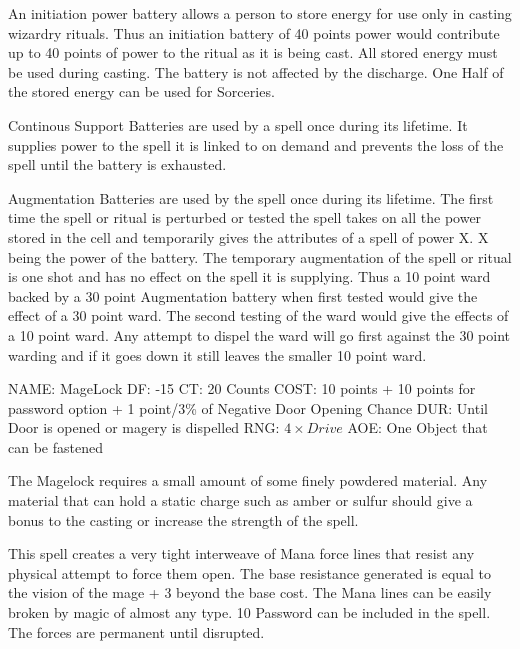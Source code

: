An initiation power battery allows a person to store energy
for use only in casting wizardry rituals. Thus an initiation battery of
40 points power would contribute up to 40 points of power to the
ritual as it is being cast. All stored energy must be used during casting.
The battery is not affected by the discharge. One Half of the stored energy
can be used for Sorceries.

Continous Support Batteries are used by a spell once during
its lifetime.  It supplies power to the spell it is linked to on demand and
prevents the loss of the spell until the battery is exhausted.

Augmentation Batteries are used by the spell once during its lifetime. The
first time the spell or ritual is perturbed or tested the spell takes on all
the power stored in the cell and temporarily gives the attributes of a spell
of power X. X being the power of the battery. The temporary augmentation of
the spell or ritual is one shot and has no effect on the spell it is
supplying. Thus a 10 point ward backed by a 30 point Augmentation battery
when first tested would give the effect of a 30 point ward. The second
testing of the ward would give the effects of a 10 point ward. Any attempt to
dispel the ward will go first against the 30 point warding and if it goes
down it still leaves the smaller 10 point ward.

\newpage

\spell
NAME: MageLock
DF:   -15
CT:  20 Counts
COST:  10 points + 10 points for password option + 1 point/3\% of Negative Door Opening Chance
DUR:  Until Door is opened or magery is dispelled
RNG: \( 4 \times Drive \)
AOE:  One Object that can be fastened


The Magelock requires a small amount of some finely powdered
material. Any material that can hold a static charge such as amber or
sulfur should give a bonus to the casting or increase the strength of
the spell.


This spell creates a very tight interweave of Mana force lines that
resist any physical attempt to force them open.  The base resistance
generated is equal to the vision of the mage + 3%
beyond the base cost. The Mana lines can be easily broken by magic of almost
any type. 10 %
Password can be included in the spell. The forces are permanent until
disrupted.

